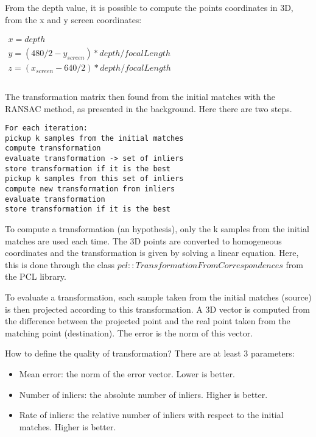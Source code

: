From the depth value, it is possible to compute the points coordinates in 3D, from the x and y screen coordinates:

\(
\begin{array}{l}
x = depth \\
y = (480/2 - y_{screen}) * depth / focalLength \\
z = (x_{screen} - 640/2) * depth / focalLength \\
\end{array}
\)

\paragraph{}
The transformation matrix then found from the initial matches with the RANSAC method, as presented in the background. Here there are two steps.

\begin{verbatim}
For each iteration:
pickup k samples from the initial matches
compute transformation
evaluate transformation -> set of inliers
store transformation if it is the best
pickup k samples from this set of inliers
compute new transformation from inliers
evaluate transformation
store transformation if it is the best
\end{verbatim}

To compute a transformation (an hypothesis), only the k samples from the initial matches are used each time. The 3D points are converted to homogeneous coordinates and the transformation is given by solving a linear equation. Here, this is done through the class $pcl::TransformationFromCorrespondences$ from the PCL library.

To evaluate a transformation, each sample taken from the initial matches (source) is then projected according to this transformation. A 3D vector is computed from the difference between the projected point and the real point taken from the matching point (destination). The error is the norm of this vector.

How to define the quality of transformation? There are at least 3 parameters:
\begin{itemize}
\item Mean error: the norm of the error vector. Lower is better.
\item Number of inliers: the absolute number of inliers. Higher is better.
\item Rate of inliers: the relative number of inliers with respect to the initial matches. Higher is better.
\end{itemize}

